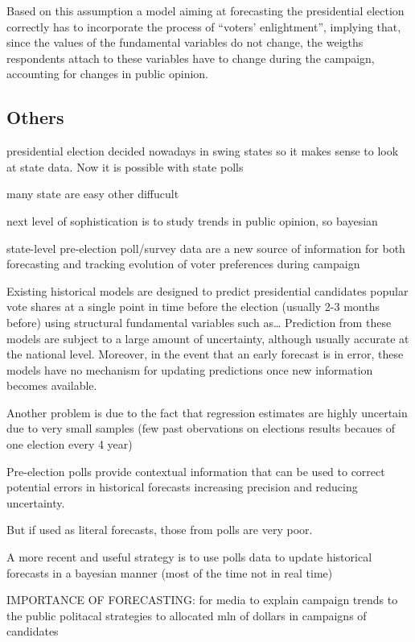 \documentclass[
  12pt]{article}
\begin{document}
Based on this assumption a model aiming at forecasting the presidential
election correctly has to incorporate the process of ``voters'
enlightment'', implying that, since the values of the fundamental
variables do not change, the weigths respondents attach to these
variables have to change during the campaign, accounting for changes in
public opinion.

\hypertarget{others}{%
\subsection{Others}\label{others}}

presidential election decided nowadays in swing states so it makes sense
to look at state data. Now it is possible with state polls

many state are easy other diffucult

next level of sophistication is to study trends in public opinion, so
bayesian

state-level pre-election poll/survey data are a new source of
information for both forecasting and tracking evolution of voter
preferences during campaign

Existing historical models are designed to predict presidential
candidates popular vote shares at a single point in time before the
election (usually 2-3 months before) using structural fundamental
variables such as\ldots{} Prediction from these models are subject to a
large amount of uncertainty, although usually accurate at the national
level. Moreover, in the event that an early forecast is in error, these
models have no mechanism for updating predictions once new information
becomes available.

Another problem is due to the fact that regression estimates are highly
uncertain due to very small samples (few past obervations on elections
results becaues of one election every 4 year)

Pre-election polls provide contextual information that can be used to
correct potential errors in historical forecasts increasing precision
and reducing uncertainty.

But if used as literal forecasts, those from polls are very poor.

A more recent and useful strategy is to use polls data to update
historical forecasts in a bayesian manner (most of the time not in real
time)

IMPORTANCE OF FORECASTING: for media to explain campaign trends to the
public politacal strategies to allocated mln of dollars in campaigns of
candidates
\end{document}
